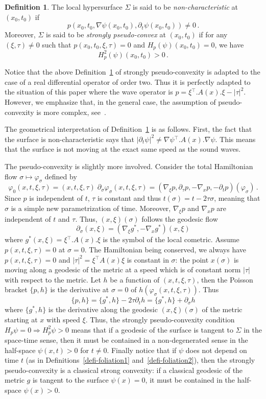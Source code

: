\documentclass[10pt]{amsart}
\theoremstyle{definition}\newtheorem{defi}[theo]{Definition}\newtheorem{rema}[theo]{Remark}\newtheorem{exam}[theo]{Example}\newtheorem{exem}[theo]{Example}\newtheorem{nota}[theo]{Notation}
\newcommand{\grad}{\nabla}
\newcommand{\trans}{{^{\intercal}}}
\begin{document}
\begin{defi}\label{defi-pseudoconvex}
The local hypersurface $\Sigma$ is said to be \emph{non-characteristic} at $(x_0,t_0)$ if
\[
p(x_0,t_0,\grad \psi(x_0,t_0),\partial_t \psi(x_0,t_0))\neq 0\,.
\]
Moreover, $\Sigma$ is said to be \emph{strongly pseudo-convex} at $(x_0,t_0)$ if for any $(\xi,\tau)\neq 0$ such that $p(x_0,t_0,\xi,\tau)=0$ and $H_p(\psi)(x_0,t_0)=0$, we have
\[
H_p^2(\psi)(x_0,t_0)>0\,.
\]
\end{defi}

Notice that the above Definition~\ref{defi-pseudoconvex} of strongly pseudo-convexity is adapted to the case of a real differential operator of order two. Thus it is perfectly adapted to the situation of this paper where the wave operator is $p=\xi\trans.A(x).\xi-|\tau|^2$. However, we emphasize that, in the general case, the assumption of pseudo-convexity is more complex, see~\cite{Hormander}.

The geometrical interpretation of Definition~\ref{defi-pseudoconvex} is as follows. First, the fact that the surface is non-characteristic says that $|\partial_t \psi|^2 \neq \grad\psi\trans.A(x).\grad \psi$. This means that the surface is not moving at the exact same speed as the sound waves.

The pseudo-convexity is slightly more involved. Consider the total Hamiltonian flow $\sigma\mapsto\varphi_\sigma$ defined by
\[
\varphi_0(x,t,\xi,\tau)=(x,t,\xi,\tau)\;\partial_\sigma
\varphi_\sigma(x,t,\xi,\tau)=(\grad_\xi p,\partial_\tau
p,-\grad_x p,-\partial_t p)(\varphi_\sigma)\,.
\]
Since $p$ is independent of $t$, $\tau$ is constant and thus $t(\sigma)=t-2\tau\sigma$, meaning that $\sigma$ is a simple new parametrization of time. Moreover, $\grad_\xi p$ and $\grad_x p$ are independent of $t$ and $\tau$. Thus, $(x,\xi)(\sigma)$ follows the geodesic flow
\[
\partial_\sigma (x,\xi)=(\grad_\xi g^*,-\grad_x g^*)(x,\xi)
\]
where $g^{*}(x,\xi)=\xi\trans.A(x).\xi$ is the symbol of the local cometric. Assume $p(x,t,\xi,\tau)=0$ at $\sigma=0$. The Hamiltonian being conserved, we always have $p(x,t,\xi,\tau)=0$ and $|\tau|^2=\xi\trans A(x)\xi$ is constant in $\sigma$: the point $x(\sigma)$ is moving along a geodesic of the metric at a speed which is of constant norm $|\tau|$ with respect to the metric. Let $h$ be a function of $(x,t,\xi,\tau)$, then the Poisson bracket $\{p,h\}$ is the derivative at $\sigma=0$ of $h(\varphi_\sigma(x,t,\xi,\tau))$. Thus
\[
\{p,h\}=\{g^*,h\} -2\tau \partial_t h=\{g^*,h\} + \partial_\sigma h
\]
where $\{g^*,h\}$ is the derivative along the geodesic $(x,\xi)(\sigma)$ of the metric starting at $x$ with speed $\xi$. Thus, the strongly pseudo-convexity condition $H_p\psi=0\Rightarrow H_p^2 \psi>0$ means that if a geodesic of the surface is tangent to $\Sigma$ in the space-time sense, then it must be contained in a non-degenerated sense in the half-space $\psi(x,t)>0$ for $t\neq0$. Finally notice that if $\psi$ does not depend on time $t$ (as in Definitions~\ref{defi-foliation1} and~\ref{defi-foliation2}), then the strongly pseudo-convexity is a classical strong convexity: if a classical geodesic of the metric $g$ is tangent to the surface $\psi(x)=0$, it must be contained in the half-space $\psi(x)>0$.
\end{document}
